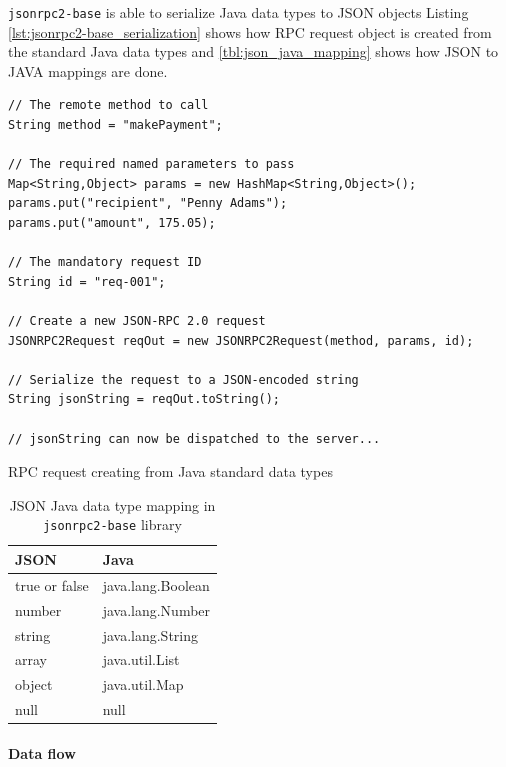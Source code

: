 \texttt{jsonrpc2-base} is able to serialize Java data types to JSON objects
Listing \ref{lst:jsonrpc2-base_serialization} shows how RPC request object is
created from the standard Java data types and \autoref{tbl:json_java_mapping}
shows how JSON to JAVA mappings are done.

\begin{listing}[H]
\begin{verbatim}
// The remote method to call
String method = "makePayment";

// The required named parameters to pass
Map<String,Object> params = new HashMap<String,Object>();
params.put("recipient", "Penny Adams");
params.put("amount", 175.05);

// The mandatory request ID
String id = "req-001";

// Create a new JSON-RPC 2.0 request
JSONRPC2Request reqOut = new JSONRPC2Request(method, params, id);

// Serialize the request to a JSON-encoded string
String jsonString = reqOut.toString();

// jsonString can now be dispatched to the server...
\end{verbatim}
\caption{RPC request creating from Java standard data types \cite{jsonrpc2-base}}
\label{lst:jsonrpc2-base_serialization}
\end{listing}


\begin{table}[h]
	\centering	
	\caption{{JSON}  {Java} data type mapping in
	\texttt{jsonrpc2-base} library \cite{jsonrpc2-base}}
	\label{tbl:json_java_mapping}
	\begin{tabularx}{0.5\textwidth}{|X|X|}
		\hline
		\textbf{JSON} & \textbf{Java} 	 	\\ \hline	    
		true or false & java.lang.Boolean 	\\ \hline	    
		number & java.lang.Number		 	\\ \hline
	   	string & java.lang.String		 	\\ \hline		
		array & java.util.List		 	\\ \hline
		object & java.util.Map			 	\\ \hline
		null & null		 	\\ \hline			  
	\end{tabularx} 

\end{table}

\paragraph{Data flow} ~\\

